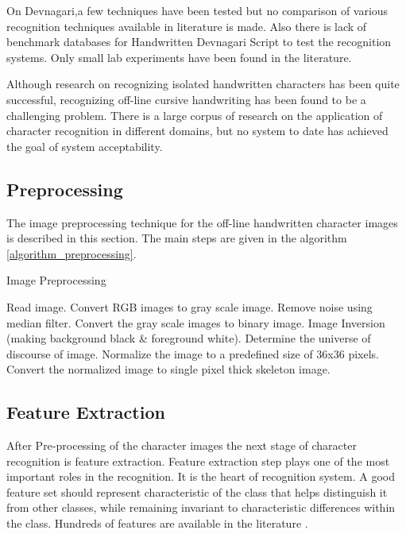 \documentclass[12pt,a4paper,oneside]{article}
\numberwithin{equation}{section}
\numberwithin{algorithm}{section}
\begin{document}
	On Devnagari,a few techniques have been tested but no comparison of various recognition techniques available in literature is made. Also there is lack of benchmark databases for Handwritten Devnagari Script to test the recognition systems. Only small lab experiments have been found in the literature.
	
	Although research on recognizing isolated handwritten characters has been quite successful, recognizing off-line cursive handwriting has been found to be a challenging problem. There is a large corpus of research on the application of character recognition in different domains, but no system to date has achieved the goal of system acceptability.
	
	
	\subsection{Preprocessing}
	\label{preprocessing}
	The image preprocessing technique \cite{Srikrishna2011} for the off-line handwritten character images is described in this section. The main steps are given in the algorithm \ref{algorithm_preprocessing}.
	
	\begin{algorithm}
	\caption{Image Preprocessing}
	\label{algorithm_preprocessing}
	\begin{algorithmic}[1]
	\STATE  Read image.
	\STATE  Convert RGB images to gray scale image.
	\STATE  Remove noise using median filter.
	\STATE  Convert the gray scale images to binary image.
	\STATE	Image Inversion (making background black \& foreground white).
	\STATE  Determine the universe of discourse of image.
	\STATE  Normalize the image to a predefined size of 36x36 pixels.
	\STATE  Convert the normalized image to single pixel thick skeleton image.
	\end{algorithmic}
	\end{algorithm}
	
	\subsection{Feature Extraction}
	\label{feature_extraction}
	After Pre-processing of the character images the next stage of character recognition is feature extraction. Feature extraction step plays one of the most important roles in the recognition. It is the heart of recognition system. A good feature set should represent  characteristic of the class that helps distinguish it from other classes, while remaining invariant to characteristic differences within the class. Hundreds of features are available in the literature \cite{Jain1996,Jain2000}.
	
\end{document}
